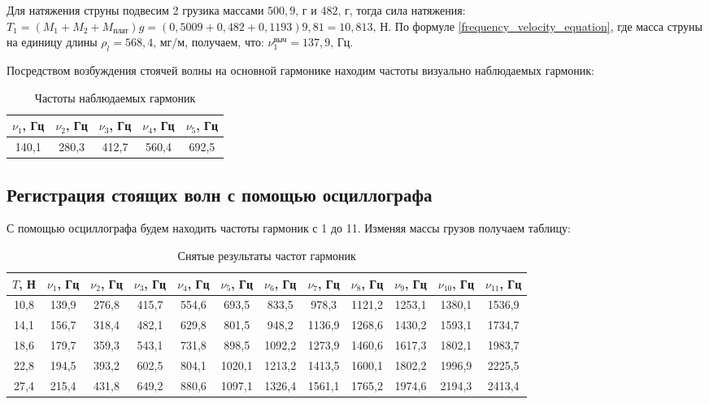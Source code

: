 \documentclass[a4paper,12pt]{article}
\begin{document}
	Для натяжения струны подвесим 2 грузика массами $500,9 \text{, г}$ и $482\text{, г}$, тогда сила натяжения: $T_1 = (M_1 + M_2 + M_\text{плат})g = (0,5009 + 0,482 + 0,1193)9,81  = 10,813 \text{, Н}$. По формуле \eqref{frequency_velocity_equation}, где масса струны на единицу длины $\rho_l = 568,4\text{, мг}/\text{м}$, получаем, что: $\nu_1^{\text{выч}} = 137,9\text{, Гц}$.
	
	Посредством возбуждения стоячей волны на основной гармонике находим частоты визуально наблюдаемых гармоник:
	\begin{table}[!h]
		\begin{center}
			\begin{tabular}{|c|c|c|c|c|}
				\hline
				$\nu_1$, Гц &$\nu_2$, Гц& $\nu_3$, Гц& $\nu_4$, Гц& $\nu_5$, Гц\\
				\hline
				140,1 & 280,3 & 412,7 & 560,4& 692,5\\
				\hline 
			\end{tabular}
		\caption{Частоты наблюдаемых гармоник}
		\end{center}
	\end{table}

	\subsection{Регистрация стоящих волн с помощью осциллографа}
	
	С помощью осциллографа будем находить частоты гармоник с 1 до 11. Изменяя массы грузов получаем таблицу:
	\begin{table}[!h]
		\begin{center}
			\begin{tabular}{|c|c|c|c|c|c|c|c|c|c|c|c|}
				\hline
				$T$, Н& $\nu_1$, Гц &$\nu_2$, Гц& $\nu_3$, Гц& $\nu_4$, Гц& $\nu_5$, Гц& $\nu_6$, Гц &$\nu_7$, Гц& $\nu_8$, Гц& $\nu_9$, Гц& $\nu_{10}$, Гц & $\nu_{11}$, Гц\\
				\hline
				10,8 & 139,9 & 276,8 & 415,7 & 554,6 & 693,5 & 833,5 & 978,3 & 1121,2 & 1253,1 & 1380,1 & 1536,9 \\ 
				\hline
				14,1 & 156,7 & 318,4 & 482,1 & 629,8 & 801,5 & 948,2 & 1136,9 & 1268,6 & 1430,2 & 1593,1 & 1734,7 \\ 
				\hline
				18,6 & 179,7 & 359,3 & 543,1 & 731,8 & 898,5 & 1092,2 & 1273,9 & 1460,6 & 1617,3 & 1802,1 & 1983,7 \\
				\hline
				22,8 & 194,5 & 393,2 & 602,5 & 804,1 & 1020,1 & 1213,2 & 1413,5 & 1600,1 & 1802,2 & 1996,9 & 2225,5 \\ 
				\hline
				27,4 & 215,4 & 431,8 & 649,2 & 880,6 & 1097,1 & 1326,4 & 1561,1 & 1765,2 & 1974,6 & 2194,3 & 2413,4 \\ 
				\hline
			\end{tabular}
		\caption{Снятые результаты частот гармоник}
		\end{center}
	\end{table}
\end{document}
